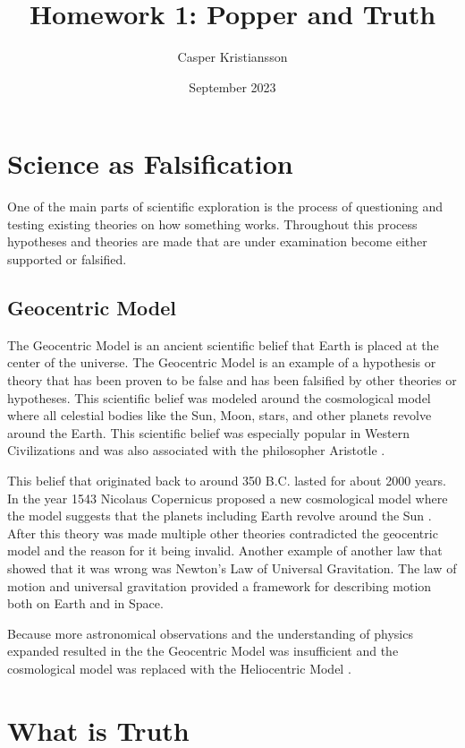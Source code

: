 \documentclass{article}
\title{Homework 1: Popper and Truth}
\author{Casper Kristiansson}
\date{September 2023}
\begin{document}
\maketitle

\section{Science as Falsification}
One of the main parts of scientific exploration is the process of questioning and testing existing theories on how something works. Throughout this process hypotheses and theories are made that are under examination become either supported or falsified.

\subsection{Geocentric Model}
The Geocentric Model is an ancient scientific belief that Earth is placed at the center of the universe. The Geocentric Model is an example of a hypothesis or theory that has been proven to be false and has been falsified by other theories or hypotheses. This scientific belief was modeled around the cosmological model where all celestial bodies like the Sun, Moon, stars, and other planets revolve around the Earth. This scientific belief was especially popular in Western Civilizations and was also associated with the philosopher Aristotle \cite{Misc123}.

This belief that originated back to around 350 B.C. lasted for about 2000 years. In the year 1543 Nicolaus Copernicus proposed a new cosmological model where the model suggests that the planets including Earth revolve around the Sun \cite{geocentric_model_the_earth_centered}. After this theory was made multiple other theories contradicted the geocentric model and the reason for it being invalid. Another example of another law that showed that it was wrong was Newton's Law of Universal Gravitation. The law of motion and universal gravitation provided a framework for describing motion both on Earth and in Space.

Because more astronomical observations and the understanding of physics expanded resulted in the the Geocentric Model was insufficient and the cosmological model was replaced with the Heliocentric Model \cite{heliocentrism}.

\section{What is Truth}
\end{document}

